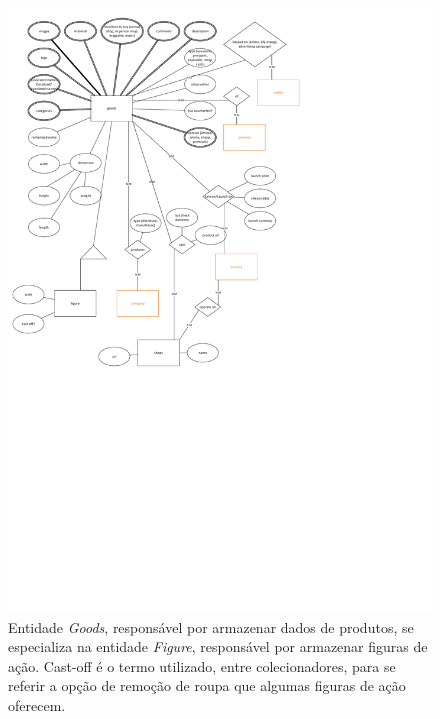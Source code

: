 \documentclass[12pt]{article}
\begin{document}
\begin{figure}[H]
\centering
\includegraphics[height=0.98\textheight,width=1.1\textwidth]{MER_-_Goods.pdf}
\caption{Entidade \textit{Goods}, responsável por armazenar dados de produtos, se especializa na entidade \textit{Figure}, responsável por armazenar figuras de ação. Cast-off é o termo utilizado, entre colecionadores, para se referir a opção de remoção de roupa que algumas figuras de ação oferecem.} \label{goods}
\end{figure}
\end{document}
